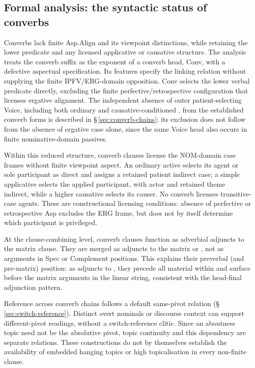 \subsection{Formal analysis: the syntactic status of converbs}
\label{sec:vm-converbs}
\label{sec:vm-converb-aspless}\label{sec:vm-converb-case}\label{sec:vm-converb-adjunct}


Converbs lack finite Asp.Align and its viewpoint distinctions, while retaining
the lower predicate and any licensed applicative or causative structure.
The analysis treats the converb suffix as the exponent of a converb head,
Conv, with a defective aspectual specification. Its features specify the
linking relation without supplying
the finite IPFV/ERG-domain opposition. Conv selects the lower verbal
predicate directly, excluding the finite perfective/retrospective configuration
that licenses ergative alignment.
The independent absence of outer patient-selecting Voice, including both
ordinary  and causative-conditioned , from the
established converb forms is described in §\,\ref{sec:converb-chains};
its exclusion does not follow from the absence of ergative case alone, since
the same Voice head also occurs in finite nominative-domain passives.


Within this reduced structure, converb clauses license the NOM-domain case frames without finite viewpoint
aspect. An ordinary active selects its agent or sole participant as direct and
assigns a retained patient indirect case; a simple applicative selects the
applied participant, with actor and retained theme indirect, while a higher
causative selects its causer. No converb licenses transitive-case agents.
These are constructional licensing conditions: absence of perfective or
retrospective Asp excludes the ERG frame, but does not by itself determine
which participant is privileged.


At the clause-combining level, converb clauses function as adverbial
adjuncts to the matrix clause. They are merged as adjuncts to the matrix
 or , not as arguments in Spec or Complement positions.
This explains their preverbal (and pre-matrix) position: as adjuncts to
, they precede all material within  and surface before
the matrix arguments in the linear string, consistent with the head-final
adjunction pattern.

Reference across converb chains follows a default same-pivot relation
 (§\,\ref{sec:switch-reference}). Distinct overt nominals or discourse
 context can support different-pivot readings, without a switch-reference
 clitic. Since an aboutness topic need not be the absolutive pivot, topic
 continuity and this dependency are separate relations. These constructions
 do not by themselves establish the availability of embedded hanging topics
 or high topicalisation in every non-finite clause.

